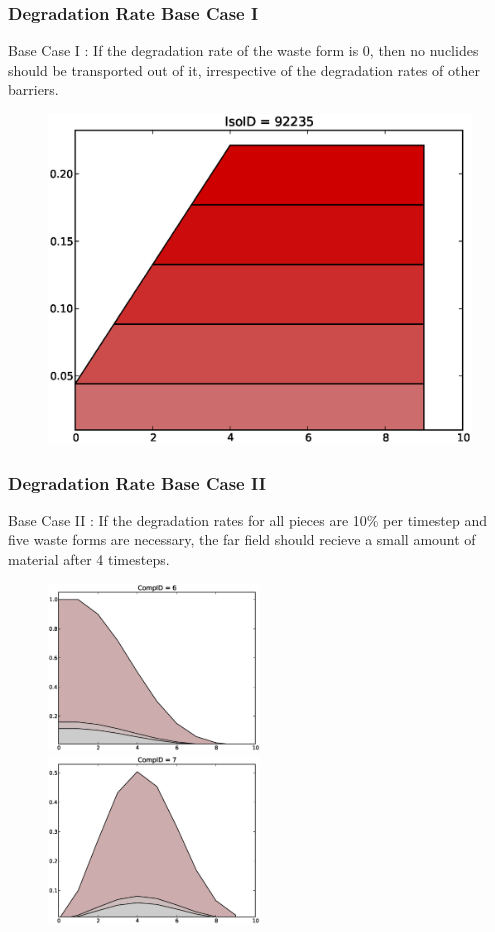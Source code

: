 \begin{frame}
  \frametitle{Degradation Rate Base Case I}
  Base Case I : If the degradation rate of the waste form is 0, then no nuclides should be 
  transported out of it, irrespective of the degradation rates of other 
  barriers. 

  \begin{figure}[htbp!]
    \begin{center}
      \includegraphics[width=.7\textwidth]{cyder/images/0deg.eps}
    \end{center}
  \end{figure}
\end{frame}


\begin{frame}
  \frametitle{Degradation Rate Base Case II}
  Base Case II : If the degradation rates for all pieces are 10\% per timestep and 
  five waste forms are necessary, the far field should recieve a  small amount
  of material after 4 timesteps.

  \begin{figure}[htbp!]
    \begin{center}
      \includegraphics[width=0.5\textwidth]{cyder/images/deg_comp6.eps}
      \includegraphics[width=0.5\textwidth]{cyder/images/deg_comp7.eps}
    \end{center}
  \end{figure}
\end{frame}

